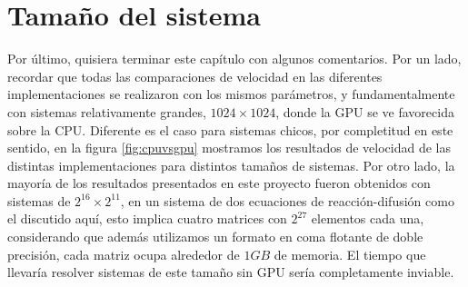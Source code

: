 \section{Tamaño del sistema}

Por último, quisiera terminar este capítulo con algunos comentarios. Por un lado, recordar que todas las comparaciones de velocidad en las diferentes 
implementaciones se realizaron con los mismos parámetros, y fundamentalmente con sistemas relativamente grandes, $1024\times1024$, donde la GPU se ve 
favorecida sobre la CPU. Diferente es el caso para sistemas chicos, por completitud en este sentido, en la figura \ref{fig:cpuvsgpu} mostramos 
los resultados de velocidad de las distintas implementaciones para distintos tamaños de sistemas. Por otro lado, la mayoría de los resultados presentados  
en este proyecto fueron obtenidos con sistemas de $2^{16} \times 2^{11}$, en un sistema de dos ecuaciones de reacción-difusión como el discutido aquí,
esto implica cuatro matrices con $2^{27}$ elementos cada una, considerando que además utilizamos un formato en coma flotante de doble precisión, cada 
matriz ocupa alrededor de $1GB$ de memoria. El tiempo que llevaría resolver sistemas de este tamaño sin GPU sería completamente inviable. 

